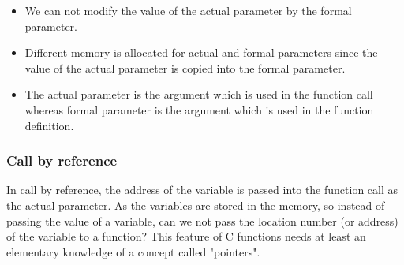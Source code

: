 \begin{itemize}
    \item We can not modify the value of the actual parameter by the formal parameter.
    \item Different memory is allocated for actual and formal parameters since the value of the actual parameter is copied into the formal parameter.
    \item The actual parameter is the argument which is used in the function call whereas formal parameter is the argument which is used in the function definition.
\end{itemize}

\subsubsection{Call by reference}
In call by reference, the address of the variable is passed into the function call as the actual parameter. As the variables are stored in the memory, so instead of passing the value of a variable, can we not pass the location number (or address) of the variable to a function? This feature of C functions needs at least an elementary knowledge of a concept called "pointers".

